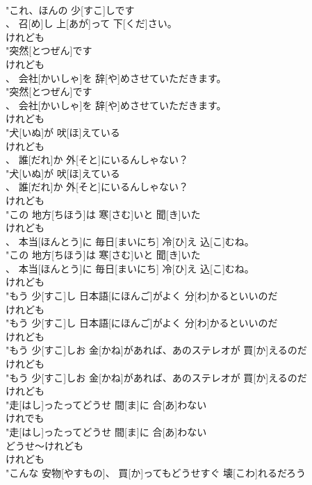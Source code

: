 \documentclass[8pt]{extreport}
\begin{document}
\begin{CJK}{UTF8}{min}
\\	"これ、ほんの 少[すこ]しです
\\	、 召[め]し 上[あが]って 下[くだ]さい。
\\	けれども
\\	"突然[とつぜん]です
\\	けれども
\\	、 会社[かいしゃ]を 辞[や]めさせていただきます。
\\	"突然[とつぜん]です
\\	、 会社[かいしゃ]を 辞[や]めさせていただきます。
\\	けれども
\\	"犬[いぬ]が 吠[ほ]えている
\\	けれども
\\	、 誰[だれ]か 外[そと]にいるんしゃない？
\\	"犬[いぬ]が 吠[ほ]えている
\\	、 誰[だれ]か 外[そと]にいるんしゃない？
\\	けれども
\\	"この 地方[ちほう]は 寒[さむ]いと 聞[き]いた
\\	けれども
\\	、 本当[ほんとう]に 毎日[まいにち] 冷[ひ]え 込[こ]むね。
\\	"この 地方[ちほう]は 寒[さむ]いと 聞[き]いた
\\	、 本当[ほんとう]に 毎日[まいにち] 冷[ひ]え 込[こ]むね。
\\	けれども
\\	"もう 少[すこ]し 日本語[にほんご]がよく 分[わ]かるといいのだ
\\	けれども
\\	"もう 少[すこ]し 日本語[にほんご]がよく 分[わ]かるといいのだ
\\	けれども
\\	"もう 少[すこ]しお 金[かね]があれば、あのステレオが 買[か]えるのだ
\\	けれども
\\	"もう 少[すこ]しお 金[かね]があれば、あのステレオが 買[か]えるのだ
\\	けれども
\\	"走[はし]ったってどうせ 間[ま]に 合[あ]わない
\\	けれでも
\\	"走[はし]ったってどうせ 間[ま]に 合[あ]わない
\\	どうせ～けれども	
\\	けれども
\\	"こんな 安物[やすもの]、 買[か]ってもどうせすぐ 壊[こわ]れるだろう

\end{CJK}
\end{document}
